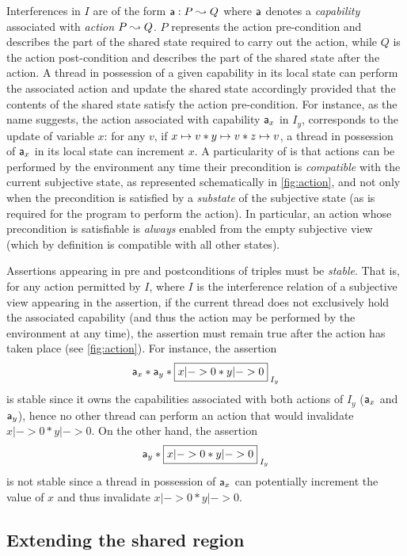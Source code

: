 Interferences in $I$ are of the form $\mathsf{a}: P \mathrel{\leadsto} Q$ where
$\mathsf{a}$ denotes a \emph{capability} associated with \emph{action}
$P \mathrel{\leadsto} Q$. $P$ represents the action pre-condition and describes the
part of the shared state required to carry out the action, while $Q$
is the action post-condition and describes the part of the shared
state after the action.  A thread in possession of a given capability
in its local state can perform the associated action and update the
shared state accordingly provided that the contents of the shared
state satisfy the action pre-condition.  For instance, as the name
suggests, the action associated with capability $\mathsf{a}_x$ in $I_y$,
corresponds to the update of variable $x$: for any $v$, if
$x \mapsto v * y \mapsto v * z \mapsto v$, a thread in possession of
$\mathsf{a}_x$ in its local state can increment $x$.  A particularity of
\colosl is that actions can be performed by the environment any time
their precondition is \emph{compatible} with the current subjective
state, as represented schematically in \fig\ref{fig:action}, and not
only when the precondition is satisfied by a \emph{substate} of the
subjective state (as is required for the program to perform the
action). In particular, an action whose precondition is satisfiable is
\emph{always} enabled from the empty subjective view (which by
definition is compatible with all other states).

Assertions appearing in pre and postconditions of triples must be
\emph{stable}. That is, for any action permitted by $I$, where $I$ is
the interference relation of a subjective view appearing in the
assertion, if the current thread does not exclusively hold the
associated capability (and thus the action may be performed by the
environment at any time), the assertion must remain true after the
action has taken place (see \fig\ref{fig:action}). For instance, the
assertion
\[
\token a_x * \token a_y * \shared{x|->0 * y|->0}{I_y}
\]
is stable since it owns the capabilities associated with both actions
of $I_y$ ($\mathsf{a}_x$ and $\mathsf{a}_y$), hence no other thread can
perform an action that would invalidate $x|->0 * y|->0$. On the other
hand, the assertion
\[
\token a_y * \shared{x|->0 * y|->0}{I_y}
\]
is not stable since a thread in possession of $\mathsf{a}_x$ can
potentially increment the value of $x$ and thus invalidate $x|->0 *
y|->0$.

\subsection{Extending the shared region}
\label{subsec:extend}

